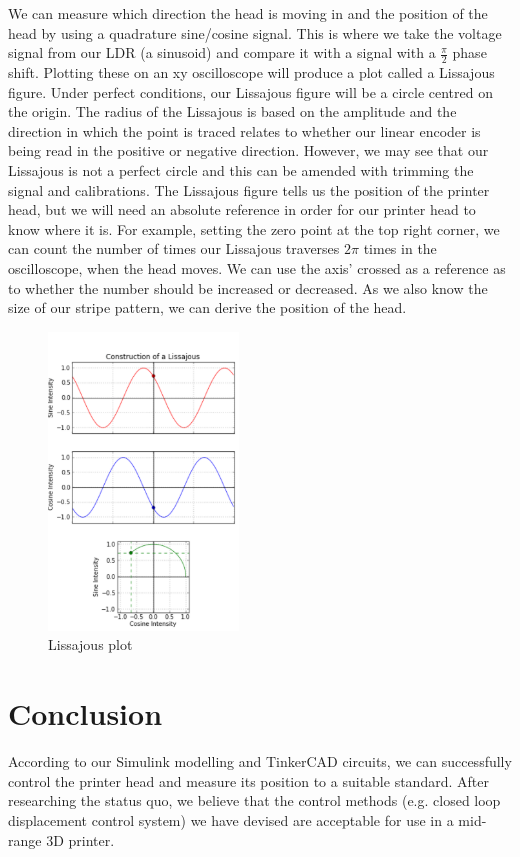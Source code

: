 \documentclass[conference]{IEEEtran}
\begin{document}
We can measure which direction the head is moving in and the position of the head by using a quadrature sine/cosine signal. This is where we take the voltage signal from our LDR (a sinusoid) and compare it with a signal with a $\frac{\pi}{2}$ phase shift. Plotting these on an xy oscilloscope will produce a plot called a Lissajous figure. Under perfect conditions, our Lissajous figure will be a circle centred on the origin. The radius of the Lissajous is based on the amplitude and the direction in which the point is traced relates to whether our linear encoder is being read in the positive or negative direction. However, we may see that our Lissajous is not a perfect circle and this can be amended with trimming the signal and calibrations. The Lissajous figure tells us the position of the printer head, but we will need an absolute reference in order for our printer head to know where it is. For example, setting the zero point at the top right corner, we can count the number of times our Lissajous traverses $2\pi$ times in the oscilloscope, when the head moves. We can use the axis' crossed as a reference as to whether the number should be increased or decreased. As we also know the size of our stripe pattern, we can derive the position of the head.
\begin{figure}[htbp]
    \centerline{\includegraphics[width = 0.45\textwidth]{../img/Lissajous1.png}}
    \caption{Lissajous plot}
\end{figure}

\section*{Conclusion}
According to our Simulink modelling and TinkerCAD circuits, we can successfully control the printer head and measure its position to a suitable standard. After researching the status quo, we believe that the control methods (e.g. closed loop displacement control system) we have devised are acceptable for use in a mid-range 3D printer.
\end{document}
